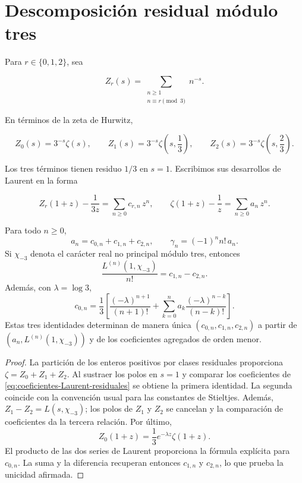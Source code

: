 \section{Descomposición residual módulo tres}

Para $r\in\{0,1,2\}$, sea

\begin{equation}
 Z_r(s)=
 \sum_{\substack{n\geq1\\n\equiv r\pmod3}}n^{-s}.
 \label{eq:canales-residuales-Zr}
\end{equation}

En términos de la zeta de Hurwitz,

\[
 Z_0(s)=3^{-s}\zeta(s),
 \qquad
 Z_1(s)=3^{-s}\zeta\!\left(s,\frac13\right),
 \qquad
 Z_2(s)=3^{-s}\zeta\!\left(s,\frac23\right).
\]

Los tres términos tienen residuo $1/3$ en $s=1$. Escribimos sus
desarrollos de Laurent en la forma

\begin{equation}
 Z_r(1+z)-\frac1{3z}=\sum_{n\geq0}c_{r,n}\,z^n,
 \qquad
 \zeta(1+z)-\frac1z=\sum_{n\geq0}a_n\,z^n.
 \label{eq:coeficientes-Laurent-residuales}
\end{equation}

\begin{theorem}
\label{thm:descomposicion-laurent-triadica}
Para todo $n\geq0$,
\[
 a_n=c_{0,n}+c_{1,n}+c_{2,n},
 \qquad
 \gamma_n=(-1)^n n!\,a_n.
\]
Si $\chi_{-3}$ denota el carácter real no principal módulo tres, entonces
\[
 \frac{L^{(n)}(1,\chi_{-3})}{n!}=c_{1,n}-c_{2,n}.
\]
Además, con \(\lambda=\log3\),
\[
 c_{0,n}=\frac13\left[
 \frac{(-\lambda)^{n+1}}{(n+1)!}
 +\sum_{k=0}^{n}a_k\frac{(-\lambda)^{n-k}}{(n-k)!}
 \right].
\]
Estas tres identidades determinan de manera única
\((c_{0,n},c_{1,n},c_{2,n})\) a partir de
\((a_n,L^{(n)}(1,\chi_{-3}))\) y de los coeficientes agregados de orden
menor.
\end{theorem}

\begin{proof}
La partición de los enteros positivos por clases residuales proporciona
$\zeta=Z_0+Z_1+Z_2$. Al sustraer los polos en $s=1$ y comparar los
coeficientes de \eqref{eq:coeficientes-Laurent-residuales} se obtiene la
primera identidad. La segunda coincide con la convención usual para las
constantes de Stieltjes. Además,
$Z_1-Z_2=L(s,\chi_{-3})$; los polos de $Z_1$ y $Z_2$ se cancelan y la
comparación de coeficientes da la tercera relación. Por último,
\[
 Z_0(1+z)=\frac13e^{-\lambda z}\zeta(1+z).
\]
El producto de las dos series de Laurent proporciona la fórmula explícita
para \(c_{0,n}\). La suma y la diferencia recuperan entonces
\(c_{1,n}\) y \(c_{2,n}\), lo que prueba la unicidad afirmada.
\end{proof}

